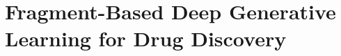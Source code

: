 \chapter{Fragment-Based Deep Generative Learning for Drug Discovery} %
\label{ch:deep-generative-learning-drug-discovery}